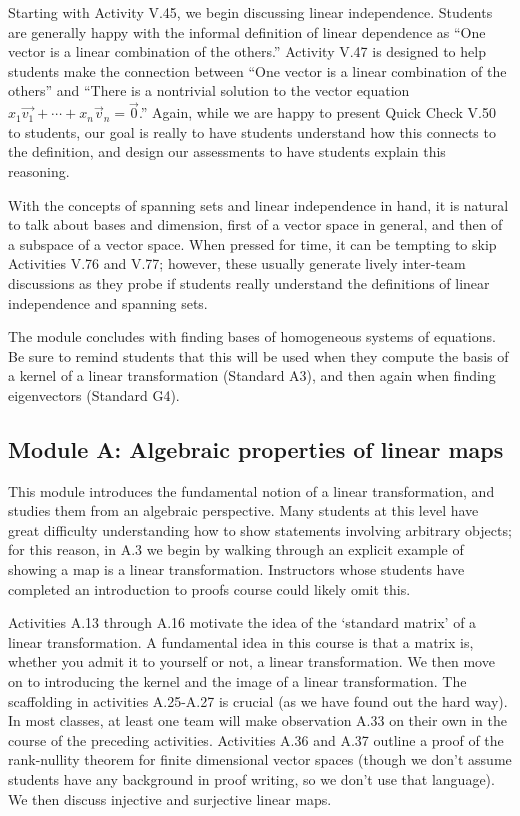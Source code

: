 \documentclass{article}
\begin{document}
Starting with Activity V.45, we begin discussing linear independence. Students are generally happy with the informal definition of linear dependence as ``One vector is a linear combination of the others.'' Activity V.47 is designed to help students make the connection between ``One vector is a linear combination of the others'' and ``There is a nontrivial solution to the vector equation \(x_1\vec{v_1}+\cdots+x_n\vec{v}_n=\vec{0}\).''  Again, while we are happy to present Quick Check V.50 to students, our goal is really to have students understand how this connects to the definition, and design our assessments to have students explain this reasoning.

With the concepts of spanning sets and linear independence in hand, it is natural to talk about bases and dimension, first of a vector space in general, and then of a subspace of a vector space. When pressed for time, it can be tempting to skip Activities V.76 and V.77; however, these usually generate lively inter-team discussions as they probe if students really understand the definitions of linear independence and spanning sets. 

 The module concludes with finding bases of homogeneous systems of equations. Be sure to remind students that this will be used when they compute the basis of a kernel of a linear transformation (Standard A3), and then again when finding eigenvectors (Standard G4).



\subsection*{Module A: Algebraic properties of linear maps}
This module introduces the fundamental notion of a linear transformation, and studies them from an algebraic perspective.   
Many students at this level have great difficulty understanding how to show statements involving arbitrary objects; for this reason, in A.3 we begin by walking through an explicit example of showing a map is a linear transformation.  Instructors whose students have completed an introduction to proofs course could likely omit this.  

Activities A.13 through A.16 motivate the idea of the `standard matrix' of a linear transformation. A fundamental idea in this course is that a matrix is, whether you admit it to yourself or not, a linear transformation. We then move on to introducing the kernel and the image of a linear transformation.  The scaffolding in activities A.25-A.27 is crucial (as we have found out the hard way).  In most classes, at least one team will make observation A.33 on their own in the course of the preceding activities.  
Activities A.36 and A.37 outline a proof of the rank-nullity theorem for finite dimensional vector spaces (though we don't assume students have any background in proof writing, so we don't use that language). We then discuss injective and surjective linear maps. 
\end{document}
